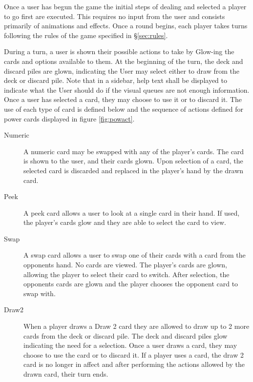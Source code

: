 \documentclass[12pt]{IEEEtran}
\begin{document}
	Once a user has begun the game the initial steps of dealing and selected a player to go first are executed. This requires no input from the user and consists primarily of animations and effects. Once a round begins, each player takes turns following the rules of the game specified in \S\ref{sec:rules}. 

	During a turn, a user is shown their possible actions to take by Glow-ing the cards and options available to them. At the beginning of the turn, the deck and discard piles are glown, indicating the User may select either to draw from the deck or discard pile. Note that in a sidebar, help text shall be displayed to indicate what the User should do if the visual queues are not enough information. Once a user has selected a card, they may choose to use it or to discard it. The use of each type of card is defined below and the sequence of actions defined for power cards displayed in figure \ref{fig:powact}.
	\begin{description}
		\item[Numeric] \hspace{1em} A numeric card may be swapped with any of the player's cards. The card is shown to the user, and their cards glown. Upon selection of a card, the selected card is discarded and replaced in the player's hand by the drawn card.
		\item[Peek] A peek card allows a user to look at a single card in their hand. If used, the player's cards glow and they are able to select the card to view.
		\item[Swap] A swap card allows a user to swap one of their cards with a card from the opponents hand. No cards are viewed. The player's cards are glown, allowing the player to select their card to switch. After selection, the opponents cards are glown and the player chooses the opponent card to swap with. 
		\item[Draw2] When a player draws a Draw 2 card they are allowed to draw up to 2 more cards from the deck or discard pile. The deck and discard piles glow indicating the need for a selection. Once a user draws a card, they may choose to use the card or to discard it. If a player uses a card, the draw 2 card is no longer in affect and after performing the actions allowed by the drawn card, their turn ends. 
	\end{description}
	
\end{document}
